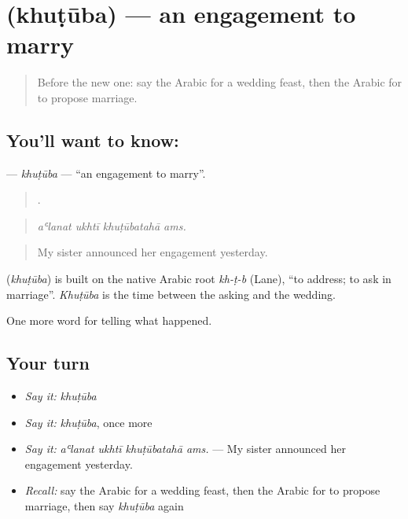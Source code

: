 \section[\texorpdfstring{\ar{خطوبة} (khuṭūba)}{خطوبة (khuṭūba)}]{ (khuṭūba) — an engagement to marry}

\label{lesson:AR-C306-khutuba}



\begin{quote}
Before the new one: say the Arabic for a wedding feast, then the Arabic for to propose marriage.
\end{quote}

\subsection*{You'll want to know: }
\textbf{} — \emph{khuṭūba} — \textquotedblleft{}an engagement to marry\textquotedblright{}.

\begin{quote}
   .
\end{quote}

\begin{quote}
\emph{aʿlanat ukhtī khuṭūbatahā ams.}
\end{quote}

\begin{quote}
My sister announced her engagement yesterday.
\end{quote}

\begin{cousinweb}
\textbf{} (\emph{khuṭūba}) is built on the native Arabic root \emph{kh-ṭ-b} (Lane), \textquotedblleft{}to address; to ask in marriage\textquotedblright{}. \emph{Khuṭūba} is the time between the asking and the wedding.
\end{cousinweb}

\begin{grammarlens}[title={What you've built}]
One more word for telling what happened.
\end{grammarlens}

\subsection*{Your turn}
\begin{itemize}
\raggedright
  \item \emph{Say it:} \emph{khuṭūba}
  \item \emph{Say it:} \emph{khuṭūba}, once more
  \item \emph{Say it:} \emph{aʿlanat ukhtī khuṭūbatahā ams.} — My sister announced her engagement yesterday.
  \item \emph{Recall:} say the Arabic for a wedding feast, then the Arabic for to propose marriage, then say \emph{khuṭūba} again
\end{itemize}

